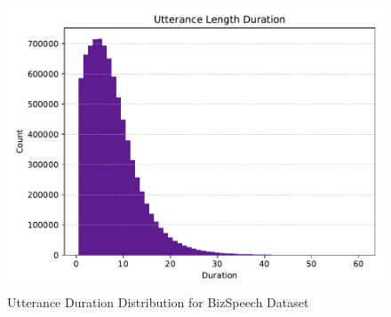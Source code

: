 \begin{figure}[ht]
  \begin{center}
    \includegraphics[width=\textwidth]{images/duration_distribution.pdf} 
    \caption{Utterance Duration Distribution for BizSpeech Dataset}
    \label{fig:utt_dist}
  \end{center}
\end{figure}

